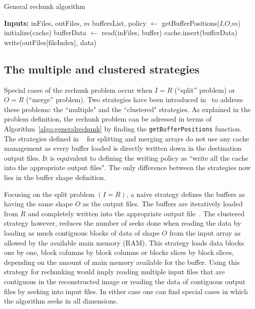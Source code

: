 \documentclass[conference]{IEEEtran}
\begin{document}
\begin{algorithm}
  \caption{General rechunk algorithm}
  \label{algo:generalrechunk}
  \begin{algorithmic}[1]
    \STATE \textbf{Inputs:} inFiles, outFiles, $m$
    \STATE buffersList, policy $\leftarrow$ getBufferPositions($I$,$O$,$m$)
    \STATE initialize(cache)
      \STATE bufferData $\leftarrow$ read(inFiles, buffer)
      \STATE cache.insert(bufferData)
        \STATE write(outFiles[fileIndex], data)
      \ENDFOR
    \ENDFOR

  \end{algorithmic}
\end{algorithm}

\subsection{The multiple and clustered strategies}
Special cases of the rechunk problem occur when $I=R$ (``split'' problem)
or $O=R$ (``merge'' problem). Two strategies have been introduced
in~\cite{seqalgorithms} to address these problems: the ``multiple" and the
``clustered" strategies. As explained in the problem definition, the rechunk
problem can be adressed in terms of Algorithm~\ref{algo:generalrechunk}
by finding the \texttt{getBufferPositions} function.
The strategies defined in ~\cite{seqalgorithms} for splitting and merging arrays
do not use any cache management as every buffer loaded is directly written down
in the destination output files. It is equivalent to defining the writing policy
as ``write all the cache into the appropriate output files". The only difference
between the strategies now lies in the buffer shape definition.

Focusing on the split problem $(I=R)$, a naive strategy defines the buffers as
having the same shape $O$ as the output files. The buffers are iteratively
loaded from $R$ and completely written into the appropriate output
file~\cite{seqalgorithms}. The clustered strategy however, reduces the number of
seeks done when reading the data by loading as much contiguous blocks of data
of shape $O$ from the input array as allowed by the available main memory (RAM).
This strategy loads data blocks one by one, block columns by block columns or
blocks slices by block slices, depending on the amount of main memory available
for the buffer. Using this strategy for rechunking would imply reading multiple
input files that are contiguous in the reconstructed image or reading the data
of contiguous output files by seeking into input files. In either case one can
find special cases in which the algorithm seeks in all dimensions.
\end{document}
